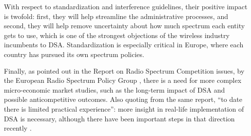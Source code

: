 With respect to standardization and interference guidelines, their positive impact is twofold: first, they will help streamline the administrative processes, and second, they will help remove uncertainty about how much spectrum each entity gets to use, which is one of the strongest objections of the wireless industry incumbents to DSA. Standardization is especially critical in Europe, where each country has pursued its own spectrum policies.
 
Finally, as pointed out in the Report on Radio Spectrum Competition issues, by the European Radio Spectrum Policy Group \cite{ref:RSPG2009}, there is a need for more complex micro-economic market studies, such as the long-term impact of DSA and possible anticompetitive outcomes. Also quoting from the same report, \enquote{to date there is limited practical experience}: more insight in real-life implementation of DSA is necessary, although there have been important steps in that direction recently \cite{Matinmikko2013}. 



 





